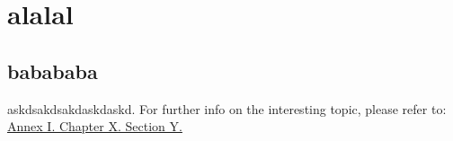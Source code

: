 % 
%





\setlength{\parindent}{0pt}

\usepackage{epigraph}
\usepackage{tocloft}
\usepackage{hyperref}
\usepackage{nameref} 
\usepackage{zref-xr}




\chapter{alalal}
\section{babababa}
askdsakdsakdaskdaskd. For further info on the interesting topic, please refer to: \hyperref[a]{Annex I. Chapter X. Section Y.}

